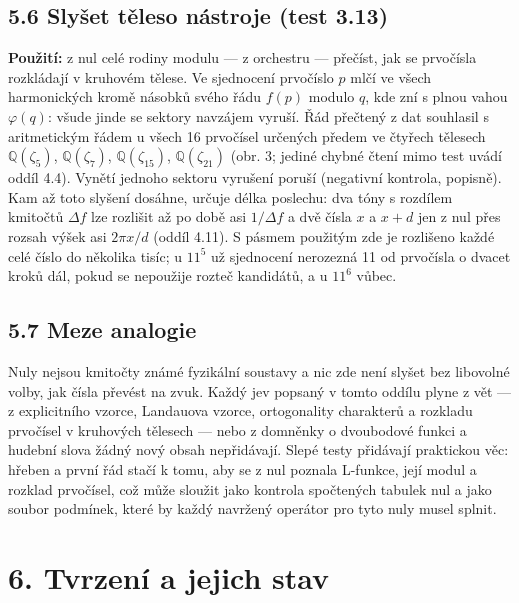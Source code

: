 \documentclass[
  10pt,
]{article}
\begin{document}
\hypertarget{slyux161et-tux11bleso-nuxe1stroje-test-3.13}{%
\subsection{5.6 Slyšet těleso nástroje (test
3.13)}\label{slyux161et-tux11bleso-nuxe1stroje-test-3.13}}

\textbf{Použití:} z nul celé rodiny modulu --- z orchestru --- přečíst,
jak se prvočísla rozkládají v kruhovém tělese. Ve sjednocení prvočíslo
\(p\) mlčí ve všech harmonických kromě násobků svého řádu \(f(p)\)
modulo \(q\), kde zní s plnou vahou \(\varphi(q)\): všude jinde se
sektory navzájem vyruší. Řád přečtený z dat souhlasil s aritmetickým
řádem u všech 16 prvočísel určených předem ve čtyřech tělesech
\(\mathbb{Q}(\zeta_5)\), \(\mathbb{Q}(\zeta_7)\),
\(\mathbb{Q}(\zeta_{15})\), \(\mathbb{Q}(\zeta_{21})\) (obr. 3; jediné
chybné čtení mimo test uvádí oddíl 4.4). Vynětí jednoho sektoru vyrušení
poruší (negativní kontrola, popisně). Kam až toto slyšení dosáhne,
určuje délka poslechu: dva tóny s rozdílem kmitočtů \(\Delta f\) lze
rozlišit až po době asi \(1/\Delta f\) a dvě čísla \(x\) a \(x + d\) jen
z nul přes rozsah výšek asi \(2\pi x/d\) (oddíl 4.11). S pásmem použitým
zde je rozlišeno každé celé číslo do několika tisíc; u \(11^5\) už
sjednocení nerozezná 11 od prvočísla o dvacet kroků dál, pokud se
nepoužije rozteč kandidátů, a u \(11^6\) vůbec.

\hypertarget{meze-analogie}{%
\subsection{5.7 Meze analogie}\label{meze-analogie}}

Nuly nejsou kmitočty známé fyzikální soustavy a nic zde není slyšet bez
libovolné volby, jak čísla převést na zvuk. Každý jev popsaný v tomto
oddílu plyne z vět --- z explicitního vzorce, Landauova vzorce,
ortogonality charakterů a rozkladu prvočísel v kruhových tělesech ---
nebo z domněnky o dvoubodové funkci a hudební slova žádný nový obsah
nepřidávají. Slepé testy přidávají praktickou věc: hřeben a první řád
stačí k tomu, aby se z nul poznala L-funkce, její modul a rozklad
prvočísel, což může sloužit jako kontrola spočtených tabulek nul a jako
soubor podmínek, které by každý navržený operátor pro tyto nuly musel
splnit.

\hypertarget{tvrzenuxed-a-jejich-stav}{%
\section{6. Tvrzení a jejich stav}\label{tvrzenuxed-a-jejich-stav}}
\end{document}
